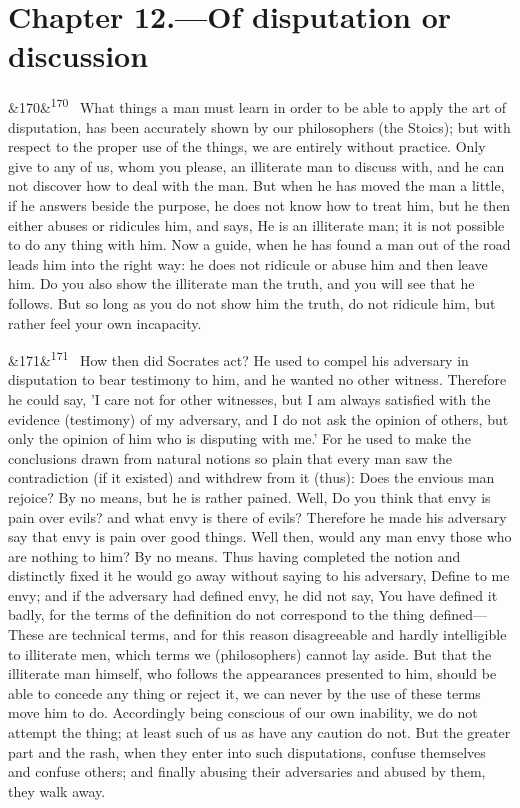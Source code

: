 \documentclass[12pt]{article}
\newcommand{\para}[1][]{\par\noindent\ifx&#1&\else\textsuperscript{\footnotesize #1}~\fi}
\begin{document}
\section*{Chapter 12.---Of disputation or discussion}

\para[170] What things a man must learn in order to be able to apply the art of disputation, has been accurately shown by our philosophers (the Stoics); but with respect to the proper use of the things, we are entirely without practice. Only give to any of us, whom you please, an illiterate man to discuss with, and he can not discover how to deal with the man. But when he has moved the man a little, if he answers beside the purpose, he does not know how to treat him, but he then either abuses or ridicules him, and says, He is an illiterate man; it is not possible to do any thing with him. Now a guide, when he has found a man out of the road leads him into the right way: he does not ridicule or abuse him and then leave him. Do you also show the illiterate man the truth, and you will see that he follows. But so long as you do not show him the truth, do not ridicule him, but rather feel your own incapacity.

\para[171] How then did Socrates act? He used to compel his adversary in disputation to bear testimony to him, and he wanted no other witness. Therefore he could say, 'I care not for other witnesses, but I am always satisfied with the evidence (testimony) of my adversary, and I do not ask the opinion of others, but only the opinion of him who is disputing with me.' For he used to make the conclusions drawn from natural notions so plain that every man saw the contradiction (if it existed) and withdrew from it (thus): Does the envious man rejoice? By no means, but he is rather pained. Well, Do you think that envy is pain over evils? and what envy is there of evils? Therefore he made his adversary say that envy is pain over good things. Well then, would any man envy those who are nothing to him? By no means. Thus having completed the notion and distinctly fixed it he would go away without saying to his adversary, Define to me envy; and if the adversary had defined envy, he did not say, You have defined it badly, for the terms of the definition do not correspond to the thing defined—These are technical terms, and for this reason disagreeable and hardly intelligible to illiterate men, which terms we (philosophers) cannot lay aside. But that the illiterate man himself, who follows the appearances presented to him, should be able to concede any thing or reject it, we can never by the use of these terms move him to do. Accordingly being conscious of our own inability, we do not attempt the thing; at least such of us as have any caution do not. But the greater part and the rash, when they enter into such disputations, confuse themselves and confuse others; and finally abusing their adversaries and abused by them, they walk away.
\end{document}

